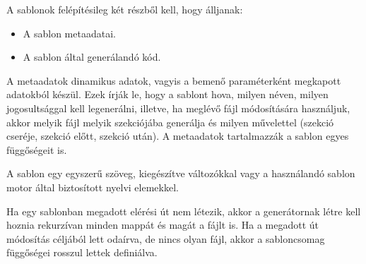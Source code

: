 \documentclass[a4paper,12pt,oneside]{report}
\begin{document}
\begin{justify}
	A sablonok felépítésileg két részből kell, hogy álljanak:

    \begin{itemize}
        \item A sablon metaadatai.
        \item A sablon által generálandó kód.
    \end{itemize}

	A metaadatok dinamikus adatok, vagyis a bemenő paraméterként megkapott adatokból készül. Ezek írják le, hogy a sablont hova, milyen néven, milyen jogosultsággal kell legenerálni, illetve, ha meglévő fájl módosítására használjuk, akkor melyik fájl melyik szekciójába generálja és milyen művelettel (szekció cseréje, szekció előtt, szekció után). A metaadatok tartalmazzák a sablon egyes függőségeit is. 

	A sablon egy egyszerű szöveg, kiegészítve változókkal vagy a használandó sablon motor által biztosított nyelvi elemekkel.

	Ha egy sablonban megadott elérési út nem létezik, akkor a generátornak létre kell hoznia rekurzívan minden mappát és magát a fájlt is. Ha a megadott út módosítás céljából lett odaírva, de nincs olyan fájl, akkor a sabloncsomag függőségei rosszul lettek definiálva.

\end{justify}

\newpage
\end{document}
